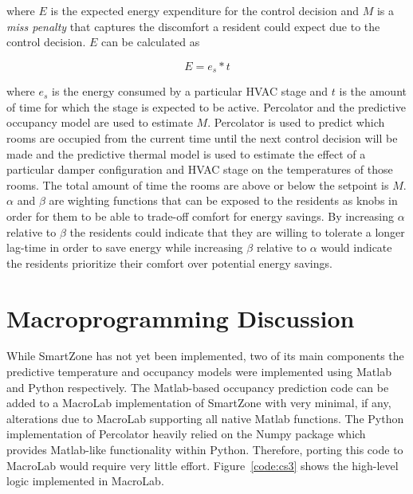\noindent where $E$ is the expected energy expenditure for the control decision
and $M$ is a {\em miss penalty} that captures the discomfort a resident could
expect due to the control decision. $E$ can be calculated as 

\begin{equation}
\label{smartzoneCostFunction}
E = e_s * t
\end{equation}

\noindent where $e_s$ is the energy consumed by a particular HVAC stage and $t$
is the amount of time for which the stage is expected to be active. Percolator
and the predictive occupancy model are used to estimate $M$. Percolator is used
to predict which rooms are occupied from the current time until the next control
decision will be made and the predictive thermal model is used to estimate the
effect of a particular damper configuration and HVAC stage on the temperatures
of those rooms. The total amount of time the rooms are above or below the
setpoint is $M$. $\alpha$ and $\beta$ are wighting functions that can be exposed
to the residents as knobs in order for them to be able to trade-off comfort for
energy savings. By increasing $\alpha$ relative to $\beta$ the residents could
indicate that they are willing to tolerate a longer lag-time in order to save
energy while increasing $\beta$ relative to $\alpha$ would indicate the
residents prioritize their comfort over potential energy savings.

\section{Macroprogramming Discussion}
While SmartZone has not yet been implemented, two of its main components the
predictive temperature and occupancy models were implemented using Matlab and
Python respectively. The Matlab-based occupancy prediction code can be added to
a MacroLab implementation of SmartZone with very minimal, if any, alterations due to
MacroLab supporting all native Matlab functions. The Python implementation of
Percolator heavily relied on the Numpy package which provides Matlab-like
functionality within Python. Therefore, porting this code to MacroLab would
require very little effort. Figure~\ref{code:cs3} shows the high-level logic
implemented in MacroLab.


